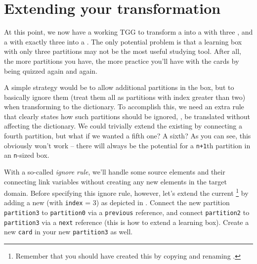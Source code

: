 \section{Extending your transformation}
\genHeader

At this point, we now have a working TGG to transform a  into a  with three , and a  with exactly three  into a . 
The only potential problem is that a learning box with only three partitions may not be the most useful studying tool. 
After all, the more partitions you have, the more practice you'll have with the cards by being quizzed again and again.

A simple strategy would be to allow additional partitions in the box, but to basically ignore them (treat them all as partitions with index greater than two) when transforming to the dictionary. 
To accomplish this, we need an extra rule that clearly states how such partitions should be ignored, \idest, be translated without affecting the dictionary. 
We could trivially extend the existing  by connecting a fourth partition, but what if we wanted a fifth one? A sixth? As you can see, this obviously won't work -- there will always be the potential for a \texttt{n+1}th partition in an \texttt{n}-sized box. 

With a so-called \emph{ignore rule}, we'll handle some source elements and their connecting link variables without creating any new elements in the target domain.
%
Before specifying this ignore rule, however, let's extend the current \footnote{Remember that you should have created this by copying and renaming .} by adding a new  (with \texttt{index} = 3) as depicted in .
Connect the new partition \texttt{partition3}  to \texttt{partition0} via a \texttt{previous} reference, and connect \texttt{partition2} to \texttt{partition3} via a \texttt{next} reference (this is how to extend a learning box).
Create a new \texttt{card} in your new \texttt{partition3} as well.

